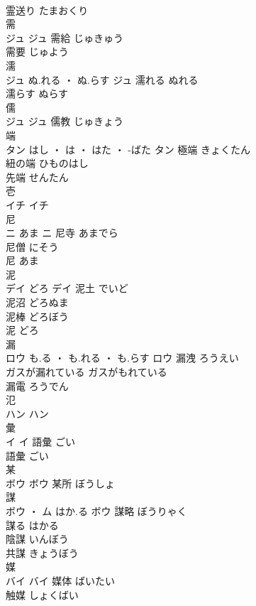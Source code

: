 \documentclass[8pt]{extreport}
\begin{document}
\begin{CJK}{UTF8}{min}
\\	霊送り	たまおくり	
\\	需	
\\	ジュ		ジュ	需給	じゅきゅう	
\\	需要	じゅよう	
\\	濡	
\\	ジュ	ぬ.れる ・ ぬ.らす	ジュ	濡れる	ぬれる	
\\	濡らす	ぬらす	
\\	儒	
\\	ジュ		ジュ													儒教	じゅきょう	
\\	端	
\\	タン	はし ・ は ・ はた ・ -ばた	タン	極端	きょくたん	
\\	紐の端	ひものはし	
\\	先端	せんたん	
\\	壱	
\\	イチ		イチ																																			
\\	尼	
\\	ニ	あま	ニ	尼寺	あまでら	
\\	尼僧	にそう	
\\	尼	あま	
\\	泥	
\\	デイ	どろ	デイ	泥土	でいど	
\\	泥沼	どろぬま	
\\	泥棒	どろぼう	
\\	泥	どろ	
\\	漏	
\\	ロウ	も.る ・ も.れる ・ も.らす	ロウ	漏洩	ろうえい	
\\	ガスが漏れている	ガスがもれている	
\\	漏電	ろうでん	
\\	氾	
\\	ハン		ハン																																			
\\	彙	
\\	イ		イ	語彙	ごい	
\\	語彙	ごい	
\\	某	
\\	ボウ		ボウ													某所	ぼうしょ	
\\	謀	
\\	ボウ ・ ム	はか.る	ボウ	謀略	ぼうりゃく	
\\	謀る	はかる	
\\	陰謀	いんぼう	
\\	共謀	きょうぼう	
\\	媒	
\\	バイ		バイ	媒体	ばいたい	
\\	触媒	しょくばい	

\end{CJK}
\end{document}
